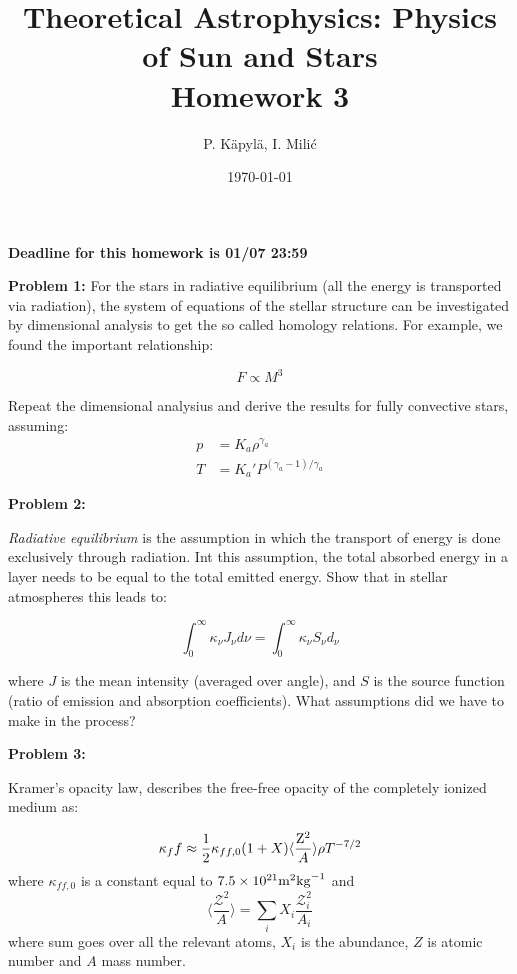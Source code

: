 \documentclass[12pt]{article}
\title{Theoretical Astrophysics: Physics of Sun and Stars\\
Homework 3}
\author{P. K\"{a}pyl\"{a}, I. Mili\'{c}}
\date{\today}
\begin{document}
\maketitle

\textbf{Deadline for this homework is \textbf{01}/07 23:59}

{\bf Problem 1:} For the stars in radiative equilibrium (all the energy is transported via radiation), the system of equations of the stellar structure can be investigated by dimensional analysis to get the so called homology relations. For example, we found the important relationship:

\begin{equation}
F \propto M^3
\end{equation}

Repeat the dimensional analysius and derive the results for fully convective stars, assuming:
\begin{align}
p &= K_a \rho^{\gamma_a} \nonumber \\
T &= K_a' P ^{(\gamma_a-1)/\gamma_a}
\end{align}

{\bf Problem 2:} 

\emph{Radiative equilibrium} is the assumption in which the transport of energy is done exclusively through radiation. Int this assumption, the total absorbed energy in a layer needs to be equal to the total emitted energy. Show that in stellar atmospheres this leads to: 

\begin{equation}
\int_0^{\infty} \kappa_\nu J_\nu d\nu = \int_0^{\infty} \kappa_\nu S_\nu d_\nu
\end{equation}

where $J$ is the mean intensity (averaged over angle), and $S$ is the source function (ratio of emission and absorption coefficients). What assumptions did we have to make in the process?


{\bf Problem 3:}

Kramer's opacity law, describes the free-free opacity of the completely ionized medium as: 

\begin{equation}
\kappa_ff \approx \frac{1}{2} \kappa_{ff,0} (1+X) \langle \frac{\rm Z^2}{A} \rangle \rho T^{-7/2}
\end{equation}
where $\kappa_{ff,0}$ is a constant equal to $7.5 \times 10^{21} {\rm m}^2 {\rm kg}^{-1}$ and 
\begin{equation}
\langle \frac{\mathcal Z^2}{A} \rangle  = \sum_i X_i \frac{\mathcal Z_i^2}{A_i} 
\end{equation}
where sum goes over all the relevant atoms, $X_i$ is the abundance, $Z$ is atomic number and $A$ mass number. 
\end{document}
